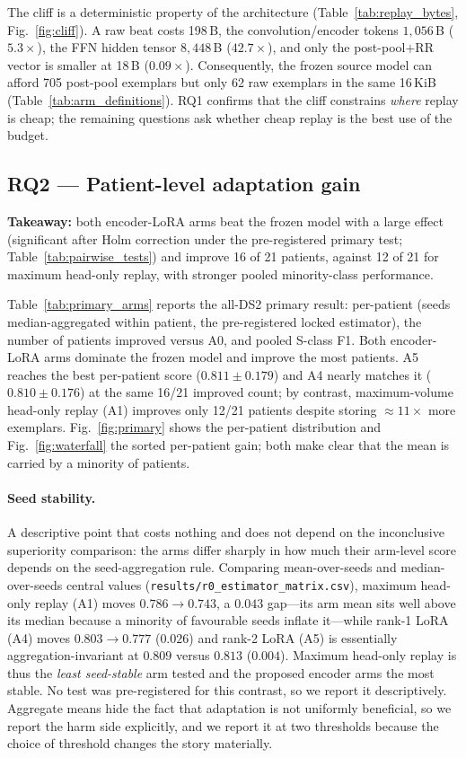 The cliff is a deterministic property of the architecture
(Table~\ref{tab:replay_bytes}, Fig.~\ref{fig:cliff}). A raw beat costs 198\,B,
the convolution/encoder tokens $1{,}056$\,B ($5.3\times$), the FFN hidden tensor
$8{,}448$\,B ($42.7\times$), and only the post-pool$+$RR vector is smaller at
18\,B ($0.09\times$). Consequently, the frozen source model can afford 705
post-pool exemplars but only 62 raw exemplars in the same 16\,KiB
(Table~\ref{tab:arm_definitions}). RQ1 confirms that the cliff constrains
\emph{where} replay is cheap; the remaining questions ask whether cheap replay
is the best use of the budget.

\subsection{RQ2 --- Patient-level adaptation gain}

\textbf{Takeaway:} both encoder-LoRA arms beat the frozen model with a large
effect (significant after Holm correction under the pre-registered primary test;
Table~\ref{tab:pairwise_tests}) and improve 16 of 21 patients, against 12 of 21
for maximum head-only replay, with stronger pooled minority-class performance.

Table~\ref{tab:primary_arms} reports the all-DS2 primary result: per-patient
\macrof{} (seeds median-aggregated within patient, the pre-registered locked
estimator), the number of patients improved versus A0, and pooled S-class F1.
Both encoder-LoRA arms dominate the frozen model and improve the most patients.
A5 reaches the best per-patient score ($0.811\pm0.179$) and A4 nearly matches it
($0.810\pm0.176$) at the same 16/21 improved count; by contrast,
maximum-volume head-only replay (A1) improves only 12/21 patients despite storing
$\approx 11\times$ more exemplars. Fig.~\ref{fig:primary} shows
the per-patient distribution and Fig.~\ref{fig:waterfall} the sorted per-patient
gain; both make clear that the mean is carried by a minority of patients.

\paragraph{Seed stability.} A descriptive point that costs nothing and does not
depend on the inconclusive superiority comparison: the arms differ sharply in how
much their arm-level score depends on the seed-aggregation rule. Comparing
mean-over-seeds and median-over-seeds central values
(\texttt{results/r0\_estimator\_matrix.csv}), maximum head-only replay (A1) moves
$0.786 \to 0.743$, a $0.043$ gap---its arm mean sits well above its median because
a minority of favourable seeds inflate it---while rank-1 LoRA (A4) moves
$0.803 \to 0.777$ ($0.026$) and rank-2 LoRA (A5) is essentially
aggregation-invariant at $0.809$ versus $0.813$ ($0.004$). Maximum head-only
replay is thus the \emph{least seed-stable} arm tested and the proposed encoder
arms the most stable. No test was pre-registered for this contrast, so we report
it descriptively.
Aggregate means hide the fact that adaptation is not uniformly beneficial, so we
report the harm side explicitly, and we report it at two thresholds because the
choice of threshold changes the story materially.

